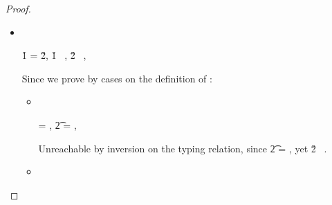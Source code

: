 \begin{lemma}
\begin{proof}
        \begin{itemize} %
          \item[]
            \begin{subcase}[\isaopsem{\v{1}}{\v{1}} = {\true{}}, \text{if} \v{1} \notequal\ {\class{}}]
              \ 

              \v{1} = \v{2}, \v{1} \notequal\ {\class{}}, \v{2} \notequal\ {\class{}}, \istrueval{\v{}}
              
              Since \istrueval{\v{}} we prove {\satisfies{\openv{}}{\thenprop{\prop{}}}}
              by cases on the definition of \isacompareliteral{}:
              \begin{itemize} %
                \item[]
                  \begin{subcase}[\isacompare{\s{}}{\pth{\classpe{}}{\pth{\pathelem{}}{\x{}}}}{\Value{\class{}}}
                                 {\filterset{\isprop{\class{}} {\pth{\pathelem{}}{\x{}}}}
                                            {\notprop{\class{}}{\pth{\pathelem{}}{\x{}}}}}]
                    \ 


                     = {\pth{\classpe{}}{\pth{\pathelem{}}{\x{}}}},
                    \t{2} = {\Value{\class{}}},
                    \inpropenv{\isprop{\class{}} {\pth{\pathelem{}}{\x{}}}}{\thenprop{\prop{}}}

                    Unreachable by inversion on the typing relation, since \t{2} = {\Value{\class{}}},
                    yet \v{2} \notequal\ {\class{}}.

%
%
%

                  \end{subcase}
                \item[]
                  \begin{subcase}
                    \ 


\end{subcase}
\end{itemize}
\end{subcase}
\end{itemize}
\end{proof}
\end{lemma}

